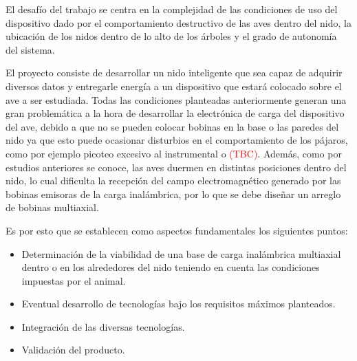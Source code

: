 El desafío del trabajo se centra en la complejidad de las condiciones de uso del dispositivo dado por el comportamiento destructivo de las aves dentro del nido, la ubicación de los nidos dentro de lo alto de los árboles y el grado de autonomía del sistema. 

El proyecto consiste de desarrollar un nido inteligente que sea capaz de adquirir diversos datos y entregarle energía a un dispositivo que estará colocado sobre el ave a ser estudiada. Todas las condiciones planteadas anteriormente generan una gran problemática a la hora de desarrollar la electrónica de carga del dispositivo del ave, debido a que no se pueden colocar bobinas en la base o las paredes del nido ya que esto puede ocasionar disturbios en el comportamiento de los pájaros, como por ejemplo picoteo excesivo al instrumental o \textcolor{red}{(TBC)}. Además, como por estudios anteriores se conoce, las aves duermen en distintas posiciones dentro del nido, lo cual dificulta la recepción del campo electromagnético generado por las bobinas emisoras de la carga inalámbrica, por lo que se debe diseñar un arreglo de bobinas multiaxial.


Es por esto que se establecen como aspectos fundamentales los siguientes puntos:
\begin{itemize}
	\item Determinación de la viabilidad de una base de carga inalámbrica multiaxial dentro o en los alrededores del nido teniendo en cuenta las condiciones impuestas por el animal.
	\item Eventual desarrollo de tecnologías bajo los requisitos máximos planteados.
	\item Integración de las diversas tecnologías.
	\item Validación del producto.
\end{itemize}

